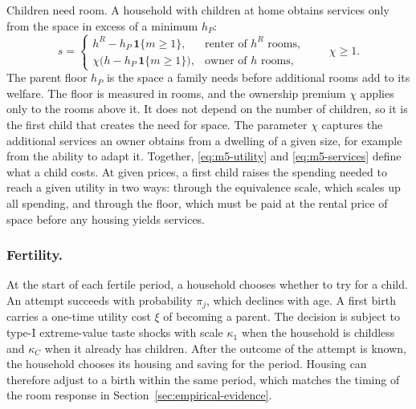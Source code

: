 Children need room. A household with children at home obtains services only
from the space in excess of a minimum $h_P$:
\begin{equation}
 s=
 \begin{cases}
 h^R-h_P\,\mathbf 1\{m\geq1\}, & \text{renter of } h^R \text{ rooms},\\[2pt]
 \chi\bigl(h-h_P\,\mathbf 1\{m\geq1\}\bigr), & \text{owner of } h \text{ rooms},
 \end{cases}
 \qquad \chi\geq1 .
 \label{eq:m5-services}
\end{equation}
The parent floor $h_P$ is the space a family needs before additional rooms
add to its welfare. The floor is measured in rooms, and the ownership
premium $\chi$ applies only to the rooms above it. It does not depend on the number of children, so it is
the first child that creates the need for space. The parameter $\chi$
captures the additional services an owner obtains from a dwelling of a given
size, for example from the ability to adapt it.
Together, \eqref{eq:m5-utility} and \eqref{eq:m5-services} define what a
child costs. At given prices, a first child raises the spending needed to
reach a given utility in two ways: through the equivalence scale, which
scales up all spending, and through the floor, which must be paid at the
rental price of space before any housing yields services.

\subsubsection*{Fertility.}
At the start of each fertile period, a household chooses whether to try for a
child. An attempt succeeds with probability $\pi_j$, which declines with age.
A first birth carries a one-time utility cost $\xi$ of becoming a parent. The
decision is subject to type-I extreme-value taste shocks with scale $\kappa_1$
when the household is childless and $\kappa_C$ when it already has children.
After the outcome of the attempt is known, the household chooses its housing
and saving for the period.
Housing can therefore adjust to a birth within the same period, which matches
the timing of the room response in Section~\ref{sec:empirical-evidence}.

